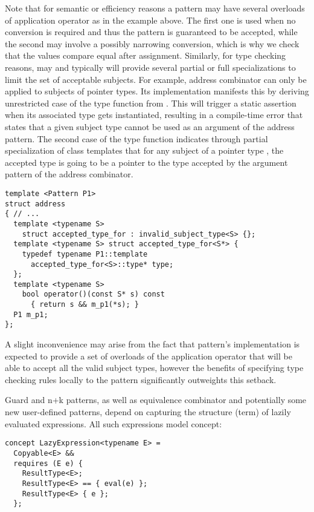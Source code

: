 \noindent
Note that for semantic or efficiency reasons a pattern may have several overloads 
of application operator as in the example above. The first one is used when no 
conversion is required and thus the pattern is guaranteed to be accepted, while 
the second may involve a possibly narrowing conversion, which is why we check 
that the values compare equal after assignment. Similarly, for type checking 
reasons,  may and typically will provide several partial 
or full specializations to limit the set of acceptable subjects. For example, 
address combinator can only be applied to subjects of pointer types. Its 
implementation manifests this by deriving unrestricted case of the type function 
 from . This will trigger 
a static assertion when its associated type  gets instantiated, 
resulting in a compile-time error that states that a given subject type  
cannot be used as an argument of the address pattern. The second case of the 
type function indicates through partial specialization of class templates that 
for any subject of a pointer type , the accepted type is going to be a 
pointer to the type accepted by the argument pattern  of the address 
combinator.

\begin{lstlisting}
template <Pattern P1>
struct address
{ // ...
  template <typename S> 
    struct accepted_type_for : invalid_subject_type<S> {};
  template <typename S> struct accepted_type_for<S*> {
    typedef typename P1::template 
      accepted_type_for<S>::type* type;
  };
  template <typename S>
    bool operator()(const S* s) const 
      { return s && m_p1(*s); }
  P1 m_p1;
};
\end{lstlisting}

\noindent
A slight inconvenience may arise from the fact that pattern's implementation is 
expected to provide a set of overloads of the application operator that will be 
able to accept all the valid subject types, however the benefits of specifying 
type checking rules locally to the pattern significantly outweights this setback.

Guard and n+k patterns, as well as equivalence combinator and potentially some 
new user-defined patterns, depend on capturing the structure (term) of lazily 
evaluated expressions. All such expressions model  concept: 

\begin{lstlisting}
concept LazyExpression<typename E> = 
  Copyable<E> &&
  requires (E e) {
    ResultType<E>;
    ResultType<E> == { eval(e) };
    ResultType<E> { e };
  };
\end{lstlisting}

